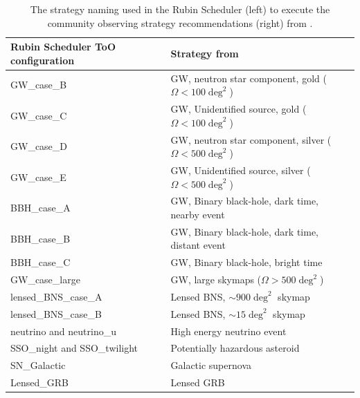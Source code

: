 \begin{table}[]
\centering
\begin{tabular}{|l|l|}
\hline
\textbf{Rubin Scheduler ToO configuration} & \textbf{Strategy from \cite{RubinToO2024}} \\ \hline \hline
GW\_case\_B                         & GW, neutron star component, gold ($\Omega <100\deg^2$)                                             \\ \hline
GW\_case\_C                         & GW, Unidentified source, gold ($\Omega <100\deg^2$)                                   \\ \hline
GW\_case\_D                         & GW, neutron star component, silver ($\Omega <500\deg^2$)                                           \\ \hline
GW\_case\_E                         & GW, Unidentified source, silver ($\Omega <500\deg^2$)                                 \\ \hline
BBH\_case\_A                        & GW, Binary black-hole, dark time, nearby event                                     \\ \hline
BBH\_case\_B                        & GW, Binary black-hole, dark time, distant event                                      \\ \hline
BBH\_case\_C                        & GW, Binary black-hole, bright time                                         \\ \hline
GW\_case\_large                     & GW, large skymaps ($\Omega>500\deg^2$)                                    \\ \hline
lensed\_BNS\_case\_A                & Lensed BNS, $\sim900\deg^2$ skymap                                      \\ \hline
lensed\_BNS\_case\_B                & Lensed BNS, $\sim15\deg^2$ skymap                                       \\ \hline
neutrino and neutrino\_u            & High energy neutrino event                                            \\ \hline
SSO\_night and SSO\_twilight                       & Potentially hazardous asteroid                                           \\ \hline
SN\_Galactic                        & Galactic supernova                                  \\ \hline
Lensed\_GRB                         & Lensed GRB                                          \\ \hline
\end{tabular}
\caption{The strategy naming used in the Rubin Scheduler (left) to execute the community observing strategy recommendations (right) from \cite{RubinToO2024}.}
\label{table:ToOStrategies_sched}
\end{table}


